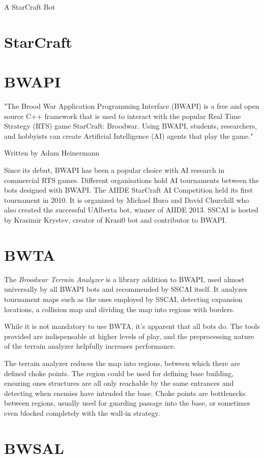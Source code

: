 \documentclass[11pt]{article}
\begin{document}
\begin{center}
{{\Large \sc A StarCraft Bot}}
\end{center}
\section*{StarCraft}

\section*{BWAPI}
"The Brood War Application Programming Interface (BWAPI) is a free and open source C++ framework that is used to interact with the popular Real Time Strategy (RTS) game StarCraft: Broodwar. Using BWAPI, students, researchers, and hobbyists can create Artificial Intelligence (AI) agents that play the game."

Written by Adam Heinermann

Since its debut, BWAPI has been a popular choice with AI research in commercial RTS games. Different organisations hold AI tournaments between the bots designed with BWAPI. The AIIDE StarCraft AI Competition held its first tournament in 2010. It is organized by Michael Buro and David Churchill who also created the successful UAlberta bot, winner of AIIDE 2013. SSCAI is hosted by Krasimir Krystev, creator of Krasi0 bot and contributor to BWAPI.

\section*{BWTA}
The \emph{Broodwar Terrain Analyzer} is a library addition to BWAPI, used almost universally by all BWAPI bots and recommended by SSCAI itself. It analyzes tournament maps such as the ones employed by SSCAI, detecting expansion locations, a collision map and dividing the map into regions with borders.

While it is not mandatory to use BWTA, it's apparent that all bots do. The tools provided are indispensable at higher levels of play, and the preprocessing nature of the terrain analyzer helpfully increases performance.

The terrain analyzer reduces the map into regions, between which there are defined choke points. The region could be used for defining base building, ensuring ones structures are all only reachable by the same entrances and detecting when enemies have intruded the base. Choke points are bottlenecks between regions, usually used for guarding passage into the base, or sometimes even blocked completely with the wall-in strategy.

\section*{BWSAL}
\end{document}
